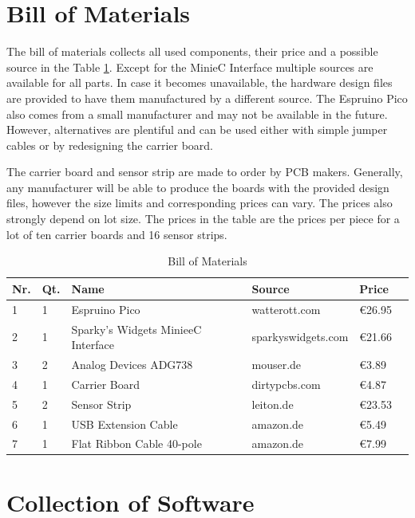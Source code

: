 \section{Bill of Materials}

The bill of materials collects all used components, their price and a possible source in the Table \ref{tab:bom}. Except for the MinieC Interface multiple sources are available for all parts. In case it becomes unavailable, the hardware design files are provided to have them manufactured by a different source. The Espruino Pico also comes from a small manufacturer and may not be available in the future. However, alternatives are plentiful and can be used either with simple jumper cables or by redesigning the carrier board.

The carrier board and sensor strip are made to order by PCB makers. Generally, any manufacturer will be able to produce the boards with the provided design files, however the size limits and corresponding prices can vary. The prices also strongly depend on lot size. The prices in the table are the prices per piece for a lot of ten carrier boards and 16 sensor strips.

\begin{table}[H]
    \centering

    \caption[BOM]{Bill of Materials}
    \label{tab:bom}
    \begin{tabular}{llllll}
        	\toprule
        	Nr. & Qt. & Name & Source & Price \tabularnewline
        	\midrule
		1 & 1 & Espruino Pico & watterott.com & \euro{26.95} \tabularnewline
		2 & 1 & Sparky's Widgets MinieeC Interface & sparkyswidgets.com & \euro{21.66} \tabularnewline
		3 & 2 & Analog Devices ADG738 & mouser.de & \euro{3.89} \tabularnewline
		4 & 1 & Carrier Board & dirtypcbs.com & \euro{4.87} \tabularnewline
		5 & 2 & Sensor Strip & leiton.de & \euro{23.53} \tabularnewline
		6 & 1 & USB Extension Cable & amazon.de & \euro{5.49} \tabularnewline
		7 & 1 &  Flat Ribbon Cable 40-pole & amazon.de & \euro{7.99} \tabularnewline
        \bottomrule
    \end{tabular}
\end{table}

\section{Collection of Software}